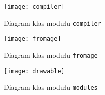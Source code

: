 \begin{figure}
  \begin{center}
    \texttt{[image: compiler]}
  \end{center}
  \caption{Diagram klas modułu \texttt{compiler}}
\end{figure}

\begin{figure}
  \begin{center}
    \texttt{[image: fromage]}
  \end{center}
  \caption{Diagram klas modułu \texttt{fromage}}
\end{figure}

\begin{figure}
  \begin{center}
    \texttt{[image: drawable]}
  \end{center}
  \caption{Diagram klas modułu \texttt{modules}}
\end{figure}
